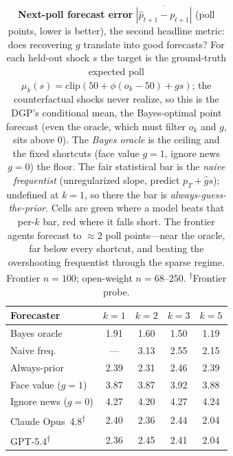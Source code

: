 \begin{table}[t]
\centering
\caption{\textbf{Next-poll forecast error} $\overline{|\hat p_{t+1}-p_{t+1}|}$ (poll points, lower is better), the second headline metric: does recovering $g$ translate into good forecasts? For each held-out shock $s$ the target is the ground-truth expected poll $\mu_k(s){=}\mathrm{clip}(50+\phi(o_k{-}50)+g s)$; the counterfactual shocks never realize, so this is the DGP's conditional mean, the Bayes-optimal point forecast (even the oracle, which must filter $o_k$ and $g$, sits above $0$). The \emph{Bayes oracle} is the ceiling and the fixed shortcuts (face value $g{=}1$, ignore news $g{=}0$) the floor. The fair statistical bar is the \emph{naive frequentist} (unregularized slope, predict $p_T{+}\hat g s$); undefined at $k{=}1$, so there the bar is \emph{always-guess-the-prior}. Cells are \colorbox{green!22}{green} where a model beats that per-$k$ bar, \colorbox{red!18}{red} where it falls short. The frontier agents forecast to $\approx2$ poll points---near the oracle, far below every shortcut, and beating the overshooting frequentist through the sparse regime. Frontier $n{=}100$; open-weight $n{=}68\text{--}250$.  \textsuperscript{$\dagger$}Frontier probe.}
\label{tab:exp2-poll}
\footnotesize
\begin{tabular}{l@{\hskip 6pt}cccc}
\toprule
\textbf{Forecaster} & $k{=}1$ & $k{=}2$ & $k{=}3$ & $k{=}5$ \\
\midrule
Bayes oracle & 1.91 & 1.60 & 1.50 & 1.19 \\
Naive freq. & --- & 3.13 & 2.55 & 2.15 \\
Always-prior & 2.39 & 2.31 & 2.46 & 2.39 \\
Face value ($g{=}1$) & 3.87 & 3.87 & 3.92 & 3.88 \\
Ignore news ($g{=}0$) & 4.27 & 4.20 & 4.27 & 4.24 \\
\midrule
Claude Opus~4.8\textsuperscript{$\dagger$} & \cellcolor{red!18}2.40 & \cellcolor{green!22}2.36 & \cellcolor{green!22}2.44 & \cellcolor{green!22}2.04 \\
GPT-5.4\textsuperscript{$\dagger$} & \cellcolor{green!22}2.36 & \cellcolor{green!22}2.45 & \cellcolor{green!22}2.41 & \cellcolor{green!22}2.04 \\

\end{tabular}
\end{table}
